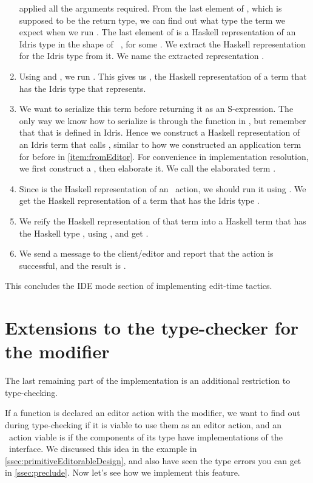 \begin{enumerate}
    applied all the arguments required.  From the last element of
    , which is supposed to be the return type, we can find out
    what type the term we expect when we run .  The last element of
     is a Haskell representation of an Idris type in the shape of
    \texttt{ }, for some . We extract the Haskell
    representation for the Idris type  from it.  We name the extracted
    representation .
  \item Using  and , we run . This
    gives us , the Haskell representation of a term that has the Idris
    type that  represents.
  \item We want to serialize this term before returning it as an S-expression.
    The only way we know how to serialize is through the  function
    in , but remember that that is defined in Idris.
    Hence we construct a Haskell representation of an Idris term that calls
    , similar to how we constructed an application term for
     before in \autoref{item:fromEditor}.
    For convenience in implementation resolution, we first construct a
    , then elaborate it. We call the elaborated term .
  \item Since  is the Haskell representation of an \Elab\ action, we
    should run it using . We get the Haskell
    representation of a term that has the Idris type .
  \item We reify the Haskell representation of that term into a Haskell term
    that has the Haskell type , using , and get
    .
  \item We send a message to the client/editor and report that the action is
    successful, and the result is .
\end{enumerate}

This concludes the IDE mode section of implementing edit-time tactics.

\section{Extensions to the type-checker for the  modifier}\label{sec:extCheck}

The last remaining part of the implementation is an additional restriction to
type-checking.

If a function is declared an editor action with the  modifier, we
want to find out during type-checking if it is viable to use them as an editor
action, and an \Elab\ action viable is if the components of its type have
implementations of the \Editorable\ interface. We discussed this idea in the
 example in \autoref{ssec:primitiveEditorableDesign}, and also have
seen the type errors you can get in \autoref{ssec:preclude}. Now let's see how
we implement this feature.

